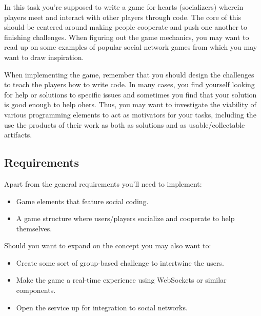\begin{refsection}
    In this task you're supposed to write a game for hearts (socializers) wherein players meet and interact with other players through code. The core of this should be centered around making people cooperate and push one another to finishing challenges. When figuring out the game mechanics, you may want to read up on some examples\supercite{wiki:socialgames} of popular social network games from which you may want to draw inspiration.


   When implementing the game, remember that you should design the challenges to teach the players how to write code. In many cases, you find yourself looking for help or solutions to specific issues and sometimes you find that your solution is good enough to help ohers. Thus, you may want to investigate the viability of various programming elements to act as motivators for your tasks, including the use the products of their work as both as solutions and as usable/collectable artifacts.
    

\subsection*{Requirements}
Apart from the general requirements you'll need to implement:
\begin{itemize}
    \item Game elements that feature social coding.
    \item A game structure where users/players socialize and cooperate to help themselves.
\end{itemize}
Should you want to expand on the concept you may also want to:
\begin{itemize}
    \item Create some sort of group-based challenge to intertwine the users.
    \item Make the game a real-time experience using WebSockets or similar components.
    \item Open the service up for integration to social networks.
\end{itemize}

\printbibliography[heading=subbibliography]
\end{refsection}

